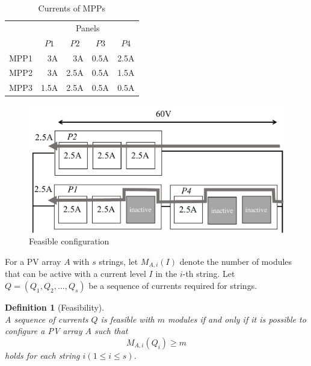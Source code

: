 \documentclass[conference]{IEEEtran}
\newtheorem{definition}{Definition}
\begin{document}

\begin{table}[t]
\caption{Currents of MPPs}
\label{tab:approximated}
\centering
\begin{tabular}{c|rrrr}	
\hline\hline
       &    	\multicolumn{4}{c}{Panels}	\\
	&	\multicolumn{1}{c}{$P1$}	&	\multicolumn{1}{c}{$P2$}	&	\multicolumn{1}{c}{$P3$}	&	\multicolumn{1}{c}{$P4$}	\\ \hline
MPP1	&	3A	&	3A	&	0.5A	&	2.5A	\\ \hline
MPP2	&	3A	&	2.5A	&	0.5A	&	1.5A	\\ \hline
MPP3	&	1.5A	&	2.5A	&	0.5A	&	0.5A	\\ \hline
\end{tabular}
\end{table}

\begin{figure}[t]
    \centering
    \includegraphics[width=0.8\linewidth]{fig/feasible-configuration.pdf}
    \caption{Feasible configuration}
    \label{fig:feasible-configuration}
\end{figure}

For a PV array $A$ with $s$ strings, let $M_{A,i}(I)$ denote the number of modules that can be active with a current level $I$ in the $i$-th string.
Let $Q = (Q_{1},Q_{2},\ldots ,Q_{s})$ be a sequence of currents required for strings. 

\begin{definition}[Feasibility]\\
A sequence of currents $Q$ is feasible with $m$ modules if and only if it is possible to configure a PV array $A$ such that 
\begin{equation}
M_{A,i}(Q_{i}) \geq m
\end{equation}
holds for each string $i (1 \leq i \leq s)$.
\end{definition}
\end{document}

